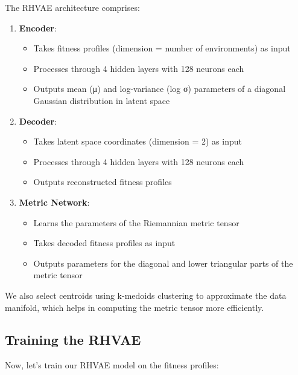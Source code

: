 \documentclass[
]{scrartcl}
\providecommand{\tightlist}{%
  \setlength{\itemsep}{0pt}\setlength{\parskip}{0pt}}\usepackage{longtable,booktabs,array}
\begin{document}
The RHVAE architecture comprises:

\begin{enumerate}
\def\labelenumi{\arabic{enumi}.}
\tightlist
\item
  \textbf{Encoder}:

  \begin{itemize}
  \tightlist
  \item
    Takes fitness profiles (dimension = number of environments) as input
  \item
    Processes through 4 hidden layers with 128 neurons each
  \item
    Outputs mean (μ) and log-variance (log σ) parameters of a diagonal
    Gaussian distribution in latent space
  \end{itemize}
\item
  \textbf{Decoder}:

  \begin{itemize}
  \tightlist
  \item
    Takes latent space coordinates (dimension = 2) as input
  \item
    Processes through 4 hidden layers with 128 neurons each
  \item
    Outputs reconstructed fitness profiles
  \end{itemize}
\item
  \textbf{Metric Network}:

  \begin{itemize}
  \tightlist
  \item
    Learns the parameters of the Riemannian metric tensor
  \item
    Takes decoded fitness profiles as input
  \item
    Outputs parameters for the diagonal and lower triangular parts of
    the metric tensor
  \end{itemize}
\end{enumerate}

We also select centroids using k-medoids clustering to approximate the
data manifold, which helps in computing the metric tensor more
efficiently.

\subsection{Training the RHVAE}\label{training-the-rhvae}

Now, let's train our RHVAE model on the fitness profiles:
\end{document}
